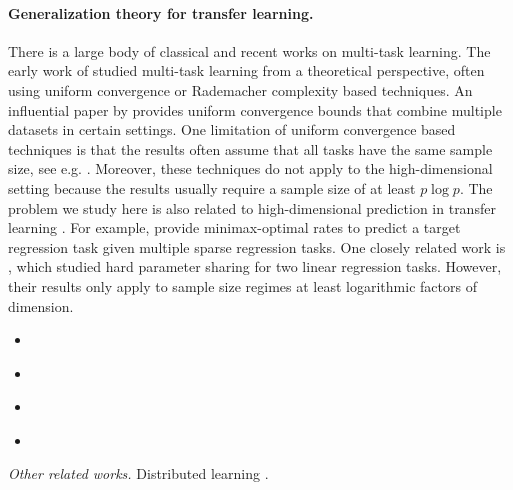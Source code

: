 \paragraph{Generalization theory for transfer learning.}
There is a large body of classical and recent works on multi-task learning.
The early work of \cite{B00,BS03,M06} studied multi-task learning from a theoretical perspective, often using uniform convergence or Rademacher complexity based techniques.
An influential paper by \cite{BBCK10} provides uniform convergence bounds that combine multiple datasets in certain settings.
One limitation of uniform convergence based techniques is that the results often assume that all  tasks have the same sample size, see e.g. \cite{B00,MPR16}.
\citet{pontil2013excess}
Moreover, these techniques do not apply to the high-dimensional setting because the results usually require a sample size of at least $p \log p$.
The problem we study here is also related to high-dimensional prediction in transfer learning \cite{li2020transfer,bastani2020predicting}.
For example, \cite{li2020transfer} provide minimax-optimal rates to predict a target regression task given multiple sparse regression tasks.
One closely related work is \cite{WZR20}, which studied hard parameter sharing for two linear regression tasks.
However, their results only apply to sample size regimes at least logarithmic factors of dimension.
\begin{itemize}
	\item \citet{lei2021nearoptimal}
	\item \citet{kalan2020minimax}
	\item  \citet{cai2021transfer}
	\item \citet{lounici2011oracle}
\end{itemize}
\textit{Other related works.} Distributed learning \cite{dobriban2018high}.



